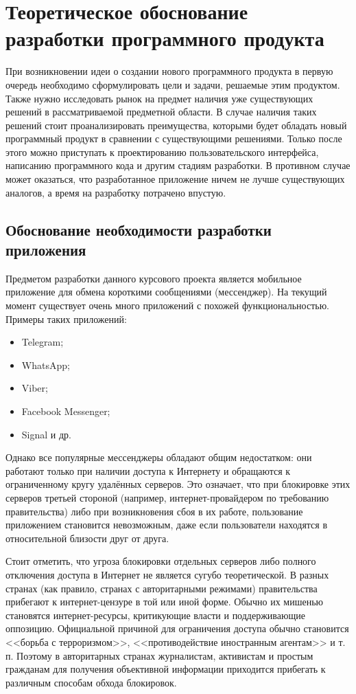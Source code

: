 
\section{Теоретическое обоснование разработки программного продукта} 
\label{sec:theory_and_motivation}

При возникновении идеи о создании нового программного продукта в первую очередь необходимо сформулировать цели и задачи, решаемые этим продуктом.
Также нужно исследовать рынок на предмет наличия уже существующих решений в рассматриваемой предметной области.
В случае наличия таких решений стоит проанализировать преимущества, которыми будет обладать новый программный продукт в сравнении с существующими решениями.
Только после этого можно приступать к проектированию пользовательского интерфейса, написанию программного кода и другим стадиям разработки.
В противном случае может оказаться, что разработанное приложение ничем не лучше существующих аналогов, а время на разработку потрачено впустую.

\subsection{Обоснование необходимости разработки приложения}
\label{sub:theory_and_motivation:motivation}

Предметом разработки данного курсового проекта является мобильное приложение для обмена короткими сообщениями (мессенджер).
На текущий момент существует очень много приложений с похожей функциональностью.
Примеры таких приложений:
\begin{itemize}
	\item Telegram;
	\item WhatsApp;
	\item Viber;
	\item Facebook Messenger;
	\item Signal и др.
\end{itemize}

Однако все популярные мессенджеры обладают общим недостатком: они работают только при наличии доступа к Интернету и обращаются к ограниченному кругу удалённых серверов.
Это означает, что при блокировке этих серверов третьей стороной (например, интернет-провайдером по требованию правительства) либо при возникновения сбоя в их работе, пользование приложением становится невозможным, даже если пользователи находятся в относительной близости друг от друга.

Стоит отметить, что угроза блокировки отдельных серверов либо полного отключения доступа в Интернет не является сугубо теоретической.
В разных странах (как правило, странах с авторитарными режимами) правительства прибегают к интернет-цензуре в той или иной форме.
Обычно их мишенью становятся интернет-ресурсы, критикующие власти и поддерживающие оппозицию.
Официальной причиной для ограничения доступа обычно становится <<борьба с терроризмом>>, <<противодействие иностранным агентам>> и т. п.
Поэтому в авторитарных странах журналистам, активистам и простым гражданам для получения объективной информации приходится прибегать к различным способам обхода блокировок.

